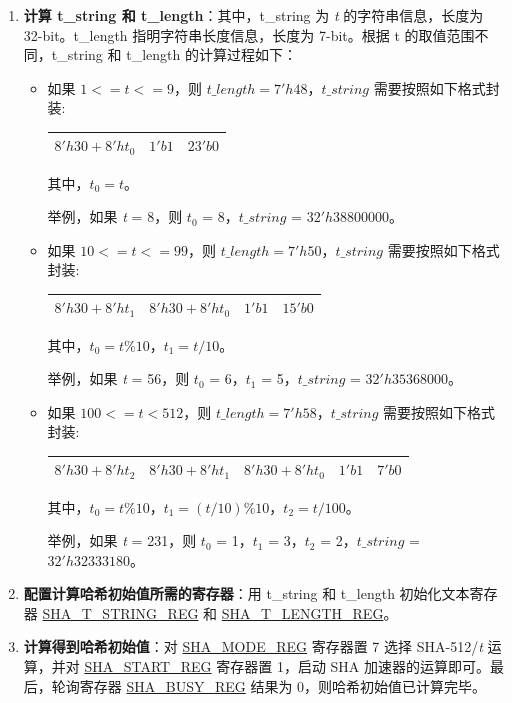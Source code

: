 \documentclass[main\_\_CN.tex]{subfiles}
\begin{document}
\begin{enumerate}\label{others:sha-512/t}
    \item \textbf{计算 t\_string 和 t\_length}：其中，t\_string 为 {\it{t}} 的字符串信息，长度为 32-bit。t\_length 指明字符串长度信息，长度为 7-bit。根据 t 的取值范围不同，t\_string 和 t\_length 的计算过程如下：

    \begin{itemize}
        \item 如果 $1<=t<=9$，则 $t\_length=7'h48$，$t\_string$ 需要按照如下格式封装:\\
        \begin{longtable}[c]{|l|l|l|}
        \hline
        $8'h30+8'ht_0$ & $1'b1$ & $23'b0$\\
        \hline
        \end{longtable}
        其中，$t_0=t$。

        举例，如果 {\it{t}} = 8，则 $t_0$ = 8，$t\_string$ = $32'h38800000$。

        \item 如果 $10<=t<=99$，则 $t\_length=7'h50$，$t\_string$ 需要按照如下格式封装:\\

        \begin{longtable}[c]{|l|l|l|l|}
        \hline
        $8'h30+8'ht_1$ & $8'h30+8'ht_0$ & $1'b1$ & $15'b0$\\
        \hline
        \end{longtable}
        其中，$t_0=t\%10$，$t_1=t/10$。

        举例，如果 {\it{t}} = 56，则 $t_0$ = 6，$t_1$ = 5，$t\_string$ = $32'h35368000$。

        \item 如果 $100<=t<512$，则 $t\_length=7'h58$，$t\_string$ 需要按照如下格式封装:\\

        \begin{longtable}[c]{|l|l|l|l|l|}
        \hline
        $8'h30+8'ht_2$ & $8'h30+8'ht_1$ & $8'h30+8'ht_0$ & $1'b1$ & $7'b0$\\
        \hline
        \end{longtable}
        其中，$t_0=t\%10$，$t_1=(t/10)\%10$，$t_2=t/100$。

        举例，如果 {\it{t}} = 231，则 $t_0$ = 1，$t_1$ = 3，$t_2$ = 2，$t\_string$ = $32'h32333180$。

    \end{itemize}
    \item \textbf{配置计算哈希初始值所需的寄存器}：用 t\_string 和 t\_length 初始化文本寄存器 \hyperref[regdesc:SHATSTRINGREG]{SHA\_T\_STRING\_REG} 和 \hyperref[regdesc:SHATLENGTHREG]{SHA\_T\_LENGTH\_REG}。

    \item \textbf{计算得到哈希初始值}：对 \hyperref[regdesc:SHAMODEREG]{SHA\_MODE\_REG} 寄存器置 7 选择 SHA-512/{\it{t}} 运算，并对 \hyperref[regdesc:SHASTARTREG]{SHA\_START\_REG} 寄存器置 1，启动 SHA 加速器的运算即可。最后，轮询寄存器 \hyperref[regdesc:SHABUSYREG]{SHA\_BUSY\_REG} 结果为 0，则哈希初始值已计算完毕。
\end{enumerate}
\end{document}
